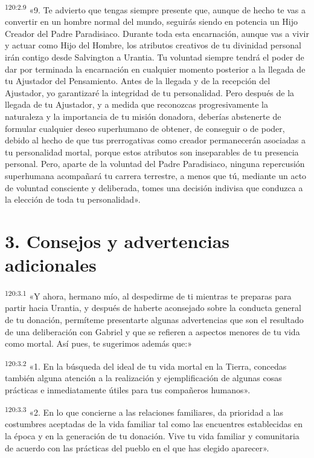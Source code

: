 \par
\textsuperscript{120:2.9} «9. Te advierto que tengas siempre presente que, aunque de hecho te vas a convertir en un hombre normal del mundo, seguirás siendo en potencia un Hijo Creador del Padre Paradisiaco. Durante toda esta encarnación, aunque vas a vivir y actuar como Hijo del Hombre, los atributos creativos de tu divinidad personal irán contigo desde Salvington a Urantia. Tu voluntad siempre tendrá el poder de dar por terminada la encarnación en cualquier momento posterior a la llegada de tu Ajustador del Pensamiento. Antes de la llegada y de la recepción del Ajustador, yo garantizaré la integridad de tu personalidad. Pero después de la llegada de tu Ajustador, y a medida que reconozcas progresivamente la naturaleza y la importancia de tu misión donadora, deberías abstenerte de formular cualquier deseo superhumano de obtener, de conseguir o de poder, debido al hecho de que tus prerrogativas como creador permanecerán asociadas a tu personalidad mortal, porque estos atributos son inseparables de tu presencia personal. Pero, aparte de la voluntad del Padre Paradisiaco, ninguna repercusión superhumana acompañará tu carrera terrestre, a menos que tú, mediante un acto de voluntad consciente y deliberada, tomes una decisión indivisa que conduzca a la elección de toda tu personalidad».

\section*{3. Consejos y advertencias adicionales}
\par
\textsuperscript{120:3.1} «Y ahora, hermano mío, al despedirme de ti mientras te preparas para partir hacia Urantia, y después de haberte aconsejado sobre la conducta general de tu donación, permíteme presentarte algunas advertencias que son el resultado de una deliberación con Gabriel y que se refieren a aspectos menores de tu vida como mortal. Así pues, te sugerimos además que:»

\par
\textsuperscript{120:3.2} «1. En la búsqueda del ideal de tu vida mortal en la Tierra, concedas también alguna atención a la realización y ejemplificación de algunas cosas prácticas e inmediatamente útiles para tus compañeros humanos».

\par
\textsuperscript{120:3.3} «2. En lo que concierne a las relaciones familiares, da prioridad a las costumbres aceptadas de la vida familiar tal como las encuentres establecidas en la época y en la generación de tu donación. Vive tu vida familiar y comunitaria de acuerdo con las prácticas del pueblo en el que has elegido aparecer».

